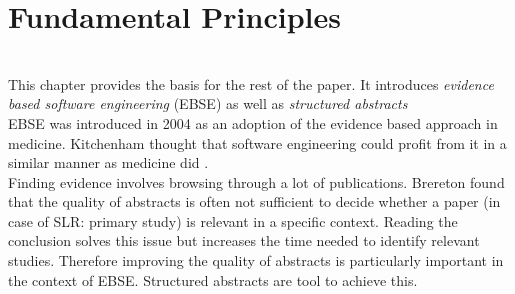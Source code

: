 
\section {Fundamental Principles}
\label{sec:fundamental principles}
\\
This chapter provides the basis for the rest of the paper. It introduces \emph{evidence based software engineering} (EBSE) as well as \emph{structured abstracts} \\
EBSE was introduced in 2004 as an adoption of the evidence based approach in medicine. Kitchenham \etal thought that software engineering could profit from it in a similar manner as medicine did \cite{EBSE}.\\
Finding evidence involves browsing through a lot of publications.  Brereton \etal found that the quality of abstracts is often not sufficient to decide whether a paper (in case of SLR:  primary study) is relevant in a specific context. Reading the conclusion solves this issue but increases the time needed to identify relevant studies. Therefore improving the quality of abstracts is  particularly important in the context of EBSE. Structured abstracts are tool to achieve this.


